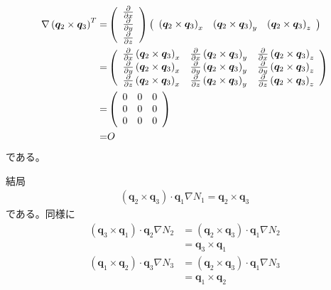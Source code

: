 \begin{align}
\nabla\left(\bm{q}_2\times\bm{q}_3\right)^T=&
\left(
\begin{array}{c}
\strut\frac{\partial}{\partial x}\\
\strut\frac{\partial}{\partial y}\\
\strut\frac{\partial}{\partial z}
\end{array}
\right)
\left(
\begin{array}{ccc}
\left(\bm{q}_2\times\bm{q}_3\right)_x &
\left(\bm{q}_2\times\bm{q}_3\right)_y &
\left(\bm{q}_2\times\bm{q}_3\right)_z
\end{array}
\right)\\
=&
\left(
\begin{array}{ccc}
\strut
\frac{\partial}{\partial x} \left(\bm{q}_2\times\bm{q}_3\right)_x &
\frac{\partial}{\partial x} \left(\bm{q}_2\times\bm{q}_3\right)_y &
\frac{\partial}{\partial x} \left(\bm{q}_2\times\bm{q}_3\right)_z \\
\strut
\frac{\partial}{\partial y} \left(\bm{q}_2\times\bm{q}_3\right)_x &
\frac{\partial}{\partial y} \left(\bm{q}_2\times\bm{q}_3\right)_y &
\frac{\partial}{\partial y} \left(\bm{q}_2\times\bm{q}_3\right)_z \\
\strut
\frac{\partial}{\partial z} \left(\bm{q}_2\times\bm{q}_3\right)_x &
\frac{\partial}{\partial z} \left(\bm{q}_2\times\bm{q}_3\right)_y &
\frac{\partial}{\partial z} \left(\bm{q}_2\times\bm{q}_3\right)_z
\end{array}
\right)\\
=&
\left(
\begin{array}{ccc}
0 & 0 & 0 \\
0 & 0 & 0 \\
0 & 0 & 0
\end{array}
\right)\\
=&O
\end{align}
である。

結局
\begin{align}
\left(\bm{q}_2\times\bm{q}_3\right)\cdot\bm{q}_1\nabla N_1
=\bm{q}_2\times\bm{q}_3
\end{align}
である。同様に
\begin{align}
\left(\bm{q}_3\times\bm{q}_1\right)\cdot\bm{q}_2\nabla N_2
&=\left(\bm{q}_2\times\bm{q}_3\right)\cdot\bm{q}_1\nabla N_2\\
&=\bm{q}_3\times\bm{q}_1\\
\left(\bm{q}_1\times\bm{q}_2\right)\cdot\bm{q}_3\nabla N_3
&=\left(\bm{q}_2\times\bm{q}_3\right)\cdot\bm{q}_1\nabla N_3\\
&=\bm{q}_1\times\bm{q}_2
\end{align}


